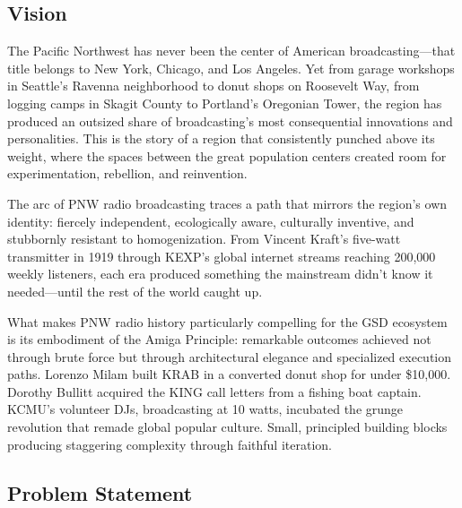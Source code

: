 \documentclass[11pt,letterpaper]{article}
\begin{document}
\subsection{Vision}

The Pacific Northwest has never been the center of American broadcasting---that title belongs to New York, Chicago, and Los Angeles. Yet from garage workshops in Seattle's Ravenna neighborhood to donut shops on Roosevelt Way, from logging camps in Skagit County to Portland's Oregonian Tower, the region has produced an outsized share of broadcasting's most consequential innovations and personalities. This is the story of a region that consistently punched above its weight, where the spaces between the great population centers created room for experimentation, rebellion, and reinvention.

The arc of PNW radio broadcasting traces a path that mirrors the region's own identity: fiercely independent, ecologically aware, culturally inventive, and stubbornly resistant to homogenization. From Vincent Kraft's five-watt transmitter in 1919 through KEXP's global internet streams reaching 200,000 weekly listeners, each era produced something the mainstream didn't know it needed---until the rest of the world caught up.

What makes PNW radio history particularly compelling for the GSD ecosystem is its embodiment of the Amiga Principle: remarkable outcomes achieved not through brute force but through architectural elegance and specialized execution paths. Lorenzo Milam built KRAB in a converted donut shop for under \$10,000. Dorothy Bullitt acquired the KING call letters from a fishing boat captain. KCMU's volunteer DJs, broadcasting at 10 watts, incubated the grunge revolution that remade global popular culture. Small, principled building blocks producing staggering complexity through faithful iteration.

\subsection{Problem Statement}
\end{document}

